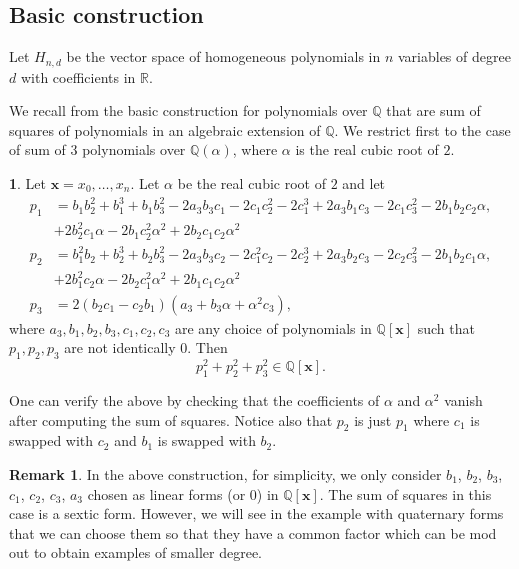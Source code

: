 \documentclass[a4paper,11pt]{amsart}%
\newcommand\Q{\mathbb{Q}}
\newcommand\R{\mathbb{R}}
\theoremstyle{definition}
\newtheorem{remark}[theorem]{Remark}
\newcommand{\thistheoremname}{}
\newtheorem{genericthm}[theorem]{\thistheoremname}
\newenvironment{namedthm}[1]
  {\renewcommand{\thistheoremname}{#1}%
   \begin{genericthm}}
  {\end{genericthm}}
\begin{document}
\subsection{Basic construction}

Let $H_{n,d}$ be the vector space of homogeneous polynomials in $n$ variables of degree $d$ with coefficients in $\R$.

We recall from \cite{laplagne} the basic construction for polynomials over $\Q$ that are sum of
squares of polynomials in an algebraic extension of $\Q$. We restrict first to the case of sum of 3 polynomials over $\Q(\alpha)$, where $\alpha$ is the real cubic root of $2$.

\begin{namedthm}{SOS Construction}\label{ls_3sos}
Let $\bm x = x_0,\dots,x_n$. Let $\alpha$ be the real cubic root of $2$ and let
\begin{align*}
p_1 &= b_1b_2^2+b_1^3+b_1b_3^2-2a_3b_3c_1-2c_1c_2^2-2c_1^3
  +2a_3b_1c_3-2c_1c_3^2-2b_1b_2c_2\alpha,\\
  &+2b_2^2c_1\alpha-2b_1c_2^2\alpha^2+2b_2c_1c_2\alpha^2\\
p_2 &= b_1^2b_2+b_2^3+b_2b_3^2-2a_3b_3c_2-2c_1^2c_2-2c_2^3
  +2a_3b_2c_3-2c_2c_3^2-2b_1b_2c_1\alpha,\\
  &+2b_1^2c_2\alpha-2b_2c_1^2\alpha^2+2b_1c_1c_2\alpha^2\\
p_3 &= 2(b_2c_1-c_2b_1)(a_3+b_3\alpha+\alpha^2c_3),
\end{align*}
where $a_3,b_1,b_2,b_3,c_1,c_2,c_3$ are any choice of polynomials in $\Q[\bm x]$ such that $p_1,p_2,p_3$ are not
identically $0$. Then
$$p_1^2 + p_2^2 + p_3^2 \in \Q[\bm x].$$

One can verify the above by
checking that the coefficients of $\alpha$ and $\alpha^2$ vanish after computing the sum of squares. Notice also that
$p_2$ is just $p_1$ where $c_1$ is swapped with $c_2$ and $b_1$ is swapped with $b_2$.
\end{namedthm}

\begin{remark}
In the above construction, for simplicity, we only consider $b_1$, $b_2$, $b_3$, $c_1$, $c_2$, $c_3$, $a_3$ chosen as linear forms (or $0$) in $\Q[\bm x]$. The sum of squares in this case is a sextic form. However, we will see in the example with quaternary forms that we can choose them so that they have a common factor which can be mod out to obtain examples of smaller degree.
\end{remark}
\end{document}
